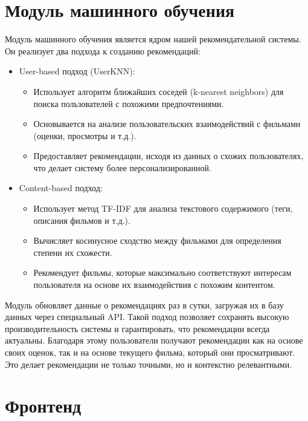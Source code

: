 \section*{Модуль машинного обучения}

Модуль машинного обучения является ядром нашей рекомендательной системы. Он реализует два подхода к созданию рекомендаций:
\begin{itemize}
    \item User-based подход (UserKNN):
    \begin{itemize}
        \item Использует алгоритм ближайших соседей (k-nearest neighbors) для поиска пользователей с похожими предпочтениями.
        \item Основывается на анализе пользовательских взаимодействий с фильмами (оценки, просмотры и т.д.).
        \item Предоставляет рекомендации, исходя из данных о схожих пользователях, что делает систему более персонализированной.
    \end{itemize}
    \item Content-based подход:
    \begin{itemize}
        \item Использует метод TF-IDF для анализа текстового содержимого (теги, описания фильмов и т.д.).
        \item Вычисляет косинусное сходство между фильмами для определения степени их схожести.
        \item Рекомендует фильмы, которые максимально соответствуют интересам пользователя на основе их взаимодействия с похожим контентом.
    \end{itemize}
\end{itemize}

Модуль обновляет данные о рекомендациях раз в сутки, загружая их в базу данных через специальный API. Такой подход позволяет сохранять высокую производительность системы и гарантировать, что рекомендации всегда актуальны. Благодаря этому пользователи получают рекомендации как на основе своих оценок, так и на основе текущего фильма, который они просматривают. Это делает рекомендации не только точными, но и контекстно релевантными.

\section*{Фронтенд}

